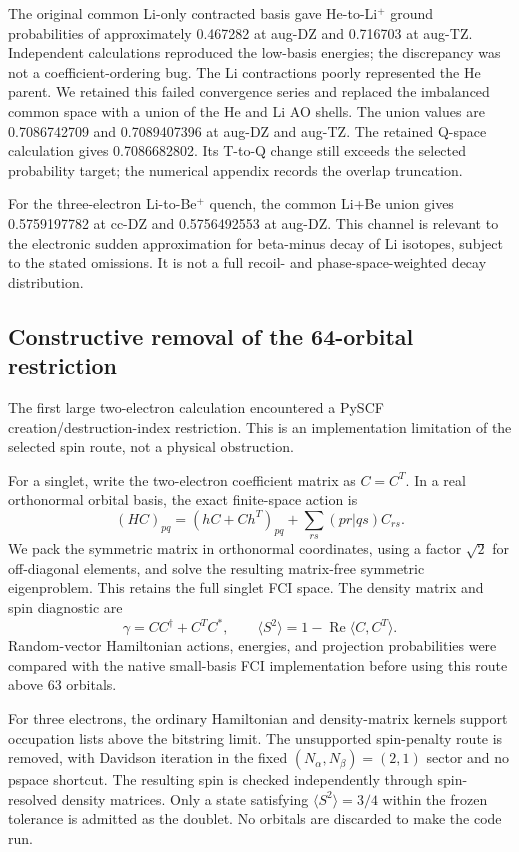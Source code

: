 \documentclass[
  10pt,
]{article}
\begin{document}
The original common Li-only contracted basis gave He-to-Li\(^{+}\)
ground probabilities of approximately 0.467282 at aug-DZ and 0.716703 at
aug-TZ. Independent calculations reproduced the low-basis energies; the
discrepancy was not a coefficient-ordering bug. The Li contractions
poorly represented the He parent. We retained this failed convergence
series and replaced the imbalanced common space with a union of the He
and Li AO shells. The union values are 0.7086742709 and 0.7089407396 at
aug-DZ and aug-TZ. The retained Q-space calculation gives 0.7086682802.
Its T-to-Q change still exceeds the selected probability target; the
numerical appendix records the overlap truncation.

For the three-electron Li-to-Be\(^{+}\) quench, the common Li+Be union
gives 0.5759197782 at cc-DZ and 0.5756492553 at aug-DZ. This channel is
relevant to the electronic sudden approximation for beta-minus decay of
Li isotopes, subject to the stated omissions. It is not a full recoil-
and phase-space-weighted decay distribution.

\hypertarget{constructive-removal-of-the-64-orbital-restriction}{%
\subsection{Constructive removal of the 64-orbital
restriction}\label{constructive-removal-of-the-64-orbital-restriction}}

The first large two-electron calculation encountered a PySCF
creation/destruction-index restriction. This is an implementation
limitation of the selected spin route, not a physical obstruction.

For a singlet, write the two-electron coefficient matrix as \(C=C^T\).
In a real orthonormal orbital basis, the exact finite-space action is \[
(HC)_{pq}=(hC+Ch^T)_{pq}
+\sum_{rs}(pr|qs)C_{rs}.
\] We pack the symmetric matrix in orthonormal coordinates, using a
factor \(\sqrt{2}\) for off-diagonal elements, and solve the resulting
matrix-free symmetric eigenproblem. This retains the full singlet FCI
space. The density matrix and spin diagnostic are \[
\gamma=CC^\dagger+C^TC^*,\qquad
\langle S^2\rangle=1-\operatorname{Re}\langle C,C^T\rangle.
\] Random-vector Hamiltonian actions, energies, and projection
probabilities were compared with the native small-basis FCI
implementation before using this route above 63 orbitals.

For three electrons, the ordinary Hamiltonian and density-matrix kernels
support occupation lists above the bitstring limit. The unsupported
spin-penalty route is removed, with Davidson iteration in the fixed
\((N_\alpha,N_\beta)=(2,1)\) sector and no pspace shortcut. The
resulting spin is checked independently through spin-resolved density
matrices. Only a state satisfying \(\langle S^2\rangle=3/4\) within the
frozen tolerance is admitted as the doublet. No orbitals are discarded
to make the code run.
\end{document}
